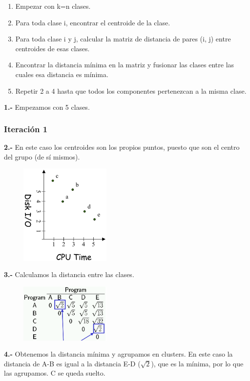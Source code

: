\begin{enumerate}[label=\arabic*)]
    \item Empezar con k=n clases.
    \item Para toda clase i, encontrar el centroide de la clase.
    \item Para toda clase i y j, calcular la matriz de distancia de pares (i, j) entre centroides de esas clases.
    \item Encontrar la distancia mínima en la matriz y fusionar las clases entre las cuales esa distancia es mínima.
    \item Repetir 2 a 4 hasta que todos los componentes pertenezcan a la misma clase.
\end{enumerate}
\textbf{1.- }Empezamos con 5 clases.
\subsubsection{Iteración 1}
\textbf{2.- }En este caso los centroides son los propios puntos, puesto que son el centro del grupo (de sí mismos).
\begin{figure}[H]
    \centering
    \includegraphics[width=0.4\textwidth]{Images/Agrupaminto.png}
\end{figure}
\textbf{3.- }Calculamos la distancia entre las clases.
\begin{figure}[H]
    \centering
    \includegraphics[width=0.4\textwidth]{Images/MST-D1.png}
\end{figure}
\textbf{4.- }Obtenemos la distancia mínima y agrupamos en clusters. En este caso la distancia de A-B es igual a la distancia E-D ($\sqrt{2}$), que es la mínima, por lo que las agrupamos. C se queda suelto.
